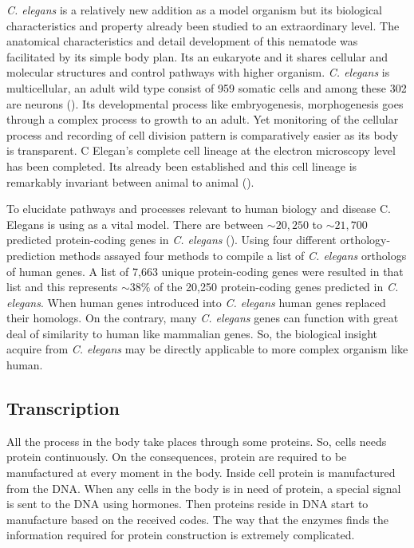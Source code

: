 \textit{C. elegans} is a relatively new addition as a model organism but its biological characteristics and property already been studied to an extraordinary level. The anatomical characteristics and detail development of this nematode was facilitated by its simple body plan. Its an eukaryote and it shares cellular and molecular structures and control pathways with higher organism. \textit{C. elegans}
is multicellular, an adult wild type  consist of 959 somatic cells and among these 302 are neurons (\cite{Sulston:1977, Palikaras:2013}). Its developmental process like embryogenesis, morphogenesis goes through a complex process to growth to an adult. Yet monitoring of the cellular process  and recording of cell division pattern is comparatively easier as its body is transparent. C Elegan's complete cell lineage at the electron microscopy level has been completed. Its already been established and this cell lineage is remarkably invariant between animal to animal (\cite{Brenner:1974, Byerly:1976, Sulston:1980, Wood:1988}).

To elucidate pathways and processes relevant to human biology and disease C. Elegans is using as a vital model. There are between $\sim20,250$ to $\sim21,700$ predicted protein-coding genes in \textit{C. elegans} (\cite{Gerstein:2010}). Using four different orthology-prediction methods \cite{Daniel:2011} assayed four methods to compile a list of \textit{C. elegans} orthologs of human genes. A  list of 7,663 unique protein-coding genes were resulted in that list and this represents $\sim38\%$ of the 20,250 protein-coding genes predicted in \textit{C. elegans}. When human genes introduced into \textit{C. elegans} human genes replaced their homologs. On the contrary, many \textit{C. elegans} genes can function with great deal of similarity to human like mammalian genes. So, the biological insight acquire from \textit{C. elegans} may be directly applicable to more complex organism like human.

\subsection{Transcription}
All the process in the body take places through some proteins. So, cells needs protein continuously. On the consequences, protein are required to be manufactured at every moment in the body. Inside cell protein is manufactured from the DNA. When any cells in the body is in need of protein, a special signal is sent to the DNA using hormones. Then proteins reside in DNA start to manufacture based on the received codes. The way that the enzymes finds the information required for protein construction is extremely complicated.

